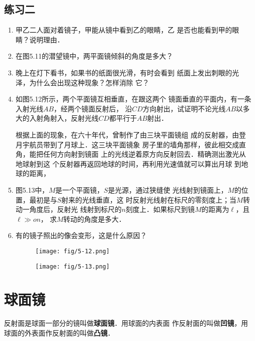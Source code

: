 \subsection*{练习二}
\begin{enumerate}
    \item 甲乙二人面对着镜子，甲能从镜中看到乙的眼睛，乙
    是否也能看到甲的眼睛？说明理由．
    \item 在图5.11的潜望镜中，两平面镜倾斜的角度是多大？
    \item 晚上在灯下看书，如果书的纸面很光滑，有时会看到
    纸面上发出刺眼的光泽，为什么会出现这种现象？怎样消除
    它？
    \item 如图5.12所示，两个平面镜互相垂直，在跟这两个
    镜面垂直的平面内，有一条入射光线$AB$，经两个镜面反射后，
    沿$CD$方向射出，试证明不论光线$AB$以多大的入射角射入，反射光线$CD$都平行于$AB$射出．
    
    根据上面的现象，在六十年代，曾制作了由三块平面镜组
    成的反射器，由登月宇航员带到了月球上．这三块平面镜象
    房子里的墙角那样，彼此相交成直角，能把任何方向射到镜面
    上的光线逆着原方向反射回去．精确测出激光从地球射到这
    个反射器再返回地球的时间，再利用光速值就可以算出月球
    到地球的距离，
    \item 图5.13中，$M$是一个平面镜，$S$是光源，通过狭缝使
    光线射到镜面上，$M$的位置，最初是与$S$射来的光线垂直，这
    时反射光线射在标尺的零刻度上；当$M$转动一角度后，反射光
    线射到标尺的$n$刻度上．如果标尺到镜$M$的距离为$\ell$，且$\ell\gg on$，
    求$M$转动的角度是多大．
    \item 有的镜子照出的像会变形，这是什么原因？
    \begin{figure}[htp]
        \centering
        \begin{minipage}[t]{0.48\textwidth}
        \centering
        \texttt{[image: fig/5-12.png]}
        \caption{}
        \end{minipage}
        \begin{minipage}[t]{0.48\textwidth}
        \centering
        \texttt{[image: fig/5-13.png]}
        \caption{}
        \end{minipage}
        \end{figure}
\end{enumerate}
    
\section{球面镜}
反射面是球面一部分的镜叫做\textbf{球面镜}．用球面的内表面
作反射面的叫做\textbf{凹镜}，用球面的外表面作反射面的叫做\textbf{凸镜}．

